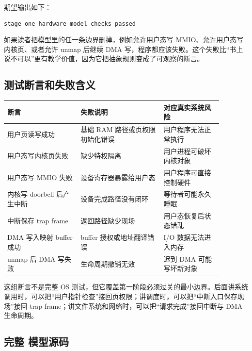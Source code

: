 期望输出如下：

\begin{lstlisting}
stage one hardware model checks passed
\end{lstlisting}

如果读者把模型里的任一条边界删掉，例如允许用户态写 MMIO、允许用户态写内核页、或者允许 unmap 后继续 DMA 写，程序都应该失败。这个失败比“书上说不可以”更有教学价值，因为它把抽象规则变成了可观察的断言。

\subsection{测试断言和失败含义}

\begin{longtable}{p{0.3\linewidth}p{0.34\linewidth}p{0.24\linewidth}}
\toprule
断言 & 失败说明 & 对应真实系统风险 \\
\midrule
用户页读写成功 & 基础 RAM 路径或页权限初始化错误 & 用户程序无法正常执行 \\
用户态写内核页失败 & 缺少特权隔离 & 用户进程可破坏内核对象 \\
用户态写 MMIO 失败 & 设备寄存器暴露给用户态 & 用户程序可直接控制硬件 \\
内核写 doorbell 后产生中断 & 设备完成路径没有闭环 & 等待者可能永久睡眠 \\
中断保存 trap frame & 返回路径缺少现场 & 用户态恢复后状态错乱 \\
DMA 写入映射 buffer 成功 & buffer 授权或地址翻译错误 & I/O 数据无法进入内存 \\
unmap 后 DMA 写失败 & 生命周期撤销无效 & 迟到 DMA 可能写坏新对象 \\
\bottomrule
\end{longtable}

这组断言不是完整 OS 测试，但它覆盖第一阶段必须过关的最小边界。后面讲系统调用时，可以把“用户指针检查”接回页权限；讲调度时，可以把“中断入口保存现场”接回 trap frame；讲文件系统和网络时，可以把“请求完成”接回中断与 DMA 生命周期。

\subsection{完整  模型源码}



